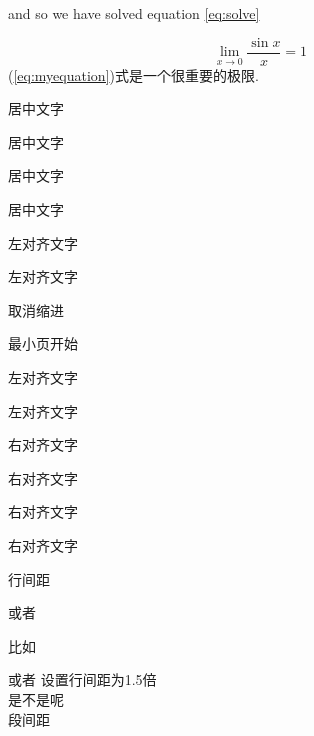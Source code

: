 \documentclass{article}
\begin{document}
and so we have solved equation \ref{eq:solve}


 \begin{equation}
 \lim_{x \to 0}\frac{\sin x}{x}=1
 \label{eq:myequation}
 \end{equation}
(\ref{eq:myequation})式是一个很重要的极限.



\begin{center}
居中文字 \

居中文字

\end{center}
 

\noindent

\begin{minipage}{\linewidth}

\centering
居中文字 \

居中文字

\end{minipage}
 

\begin{flushleft}
左对齐文字 \

左对齐文字

\end{flushleft}
 

\noindent 取消缩进

\begin{minipage}{\linewidth}
最小页开始
\raggedright
左对齐文字 \

左对齐文字

\end{minipage}
 

\begin{flushright}
右对齐文字 \

右对齐文字

\end{flushright}
 

\noindent

\begin{minipage}{\linewidth}

\raggedleft
右对齐文字 \

右对齐文字

\end{minipage}

行间距

或者

比如

\linespread{1.5}
或者
\renewcommand{\baselinestretch}{1.5}
设置行间距为1.5倍\\
是不是呢\\
段间距
\end{document}
